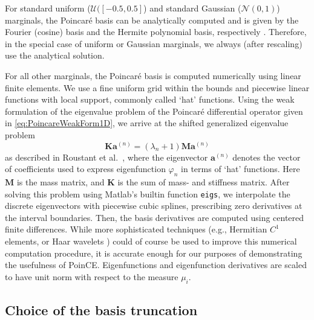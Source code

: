\documentclass[a4paper,11pt]{article}
\newcommand{\cn}{{\mathcal N}}
\newcommand{\cu}{{\mathcal U}}
\newcommand{\ve}[1]{\boldsymbol{#1}}
\renewcommand{\citep}[2][]{\cite[#1]{#2}}
\renewcommand{\citet}[2][]{\cite[#1]{#2}}
\theoremstyle{definition}
\theoremstyle{remark}
\theoremstyle{theorem}
\begin{document}
For standard uniform ($\cu([-0.5, 0.5]$) and standard Gaussian ($\cn(0,1)$) marginals, the Poincar\'e basis can be analytically computed and is given by the Fourier (cosine) basis and the Hermite polynomial basis, respectively \citep{rougam20}.
Therefore, in the special case of uniform or Gaussian marginals, we always (after rescaling) use the analytical solution.

For all other marginals, the Poincar\'e basis is computed numerically using linear finite elements.
We use a fine uniform grid within the bounds and piecewise linear functions with local support, commonly called `hat' functions.
Using the weak formulation of the eigenvalue problem of the Poincar\'e differential operator given in \eqref{eq:PoincareWeakForm1D}, we arrive at the shifted generalized eigenvalue problem
\begin{equation}
\ve K \ve a^{(n)} = (\lambda_n+1) \ve M \ve a^{(n)}
\end{equation}
as described in Roustant et al.~\citet[section 4.3]{roubar17}, where the eigenvector $\ve a^{(n)}$ denotes the vector of coefficients used to express eigenfunction $\varphi_n$ in terms of `hat' functions. Here $\ve M$ is the mass matrix, and $\ve K$ is the sum of mass- and stiffness matrix. 
After solving this problem using Matlab's builtin function \texttt{eigs}, we interpolate the discrete eigenvectors with piecewise cubic splines,
prescribing zero derivatives at the interval boundaries. Then, the basis derivatives are computed using centered finite differences.
While more sophisticated techniques (e.g., Hermitian $C^1$ elements, or Haar wavelets \citep{Bujurke2008}) could of course be used to improve this numerical computation procedure, it is accurate enough for our purposes of demonstrating the usefulness of PoinCE.
Eigenfunctions and eigenfunction derivatives are scaled to have unit norm with respect to the measure $\mu_i$. 


\subsection{Choice of the basis truncation}
\label{sec:truncation}
\end{document}
